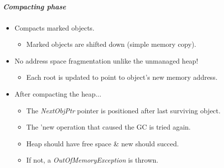 \subparagraph{Compacting phase}
\begin{itemize}
	\item Compacts marked objects.
	\begin{itemize}
		\item Marked objects are shifted down (simple memory copy).		
	\end{itemize}
	\item No address space fragmentation unlike the unmanaged heap!
	\begin{itemize}
		\item Each root is updated to point to object's new memory address.
	\end{itemize}
	\item After compacting the heap...
	\begin{itemize}
		\item The \textit{NextObjPtr} pointer is positioned after last surviving object.
		\item The 'new operation that caused the GC is tried again.
		\item Heap should have free space \& new should succed.
	\end{itemize}
	\begin{itemize}
		\item If not, a \textit{OutOfMemoryException} is thrown.
	\end{itemize}
\end{itemize}